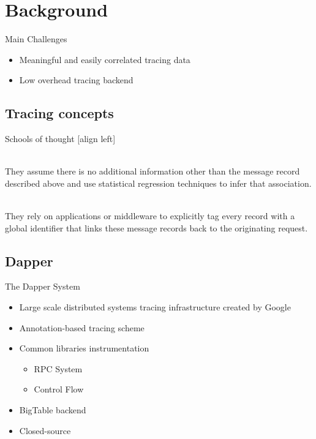 \section{Background}

\begin{frame}{Main Challenges}
\begin{itemize}  \itemsep50pt
\item Meaningful and easily correlated tracing data
\item Low overhead tracing backend
\end{itemize}
\end{frame}

\subsection{Tracing concepts}

\begin{frame}{Schools of thought}
[align left]
\begin{description} \itemsep10pt

\item[black-box schemes] \hfill \\
They assume there is no additional information other than the message record
described above and use statistical regression techniques to infer that
association.

\item[annotation-based schemes] \hfill \\
They rely on applications or middleware to explicitly tag every record with a
global identifier that links these message records back to the originating
request.

\end{description}
\end{frame}

\subsection{Dapper}

\begin{frame}{The Dapper System}

\begin{itemize}
\item Large scale distributed systems tracing infrastructure created by Google
\item Annotation-based tracing scheme
\item Common libraries instrumentation 
    \begin{itemize}
    \item RPC System
    \item Control Flow
    \end{itemize}
\item BigTable backend
\item Closed-source
\end{itemize}
\end{frame}

